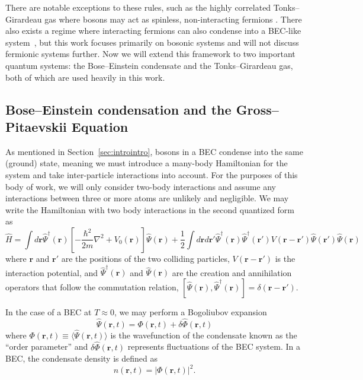 There are notable exceptions to these rules, such as the highly correlated Tonks--Girardeau gas where bosons may act as spinless, non-interacting fermions \cite{Girardeau}.
There also exists a regime where interacting fermions can also condense into a BEC-like system~\cite{Nozieres1985, Bulgac2014}, but this work focuses primarily on bosonic systems and will not discuss fermionic systems further.
Now we will extend this framework to two important quantum systems: the Bose--Einstein condensate and the Tonks--Girardeau gas, both of which are used heavily in this work.

\subsection{Bose--Einstein condensation and the Gross--Pitaevskii Equation}

As mentioned in Section~\ref{sec:introintro}, bosons in a BEC condense into the same (ground) state, meaning we must introduce a many-body Hamiltonian for the system and take inter-particle interactions into account.
For the purposes of this body of work, we will only consider two-body interactions and assume any interactions between three or more atoms are unlikely and negligible.
We may write the Hamiltonian with two body interactions in the second quantized form as
\begin{equation}
    \hat H = \int d\mathbf{r} \hat \Psi^\dagger(\mathbf{r})\left[-\frac{\hbar^2}{2m}\nabla^2 + V_0(\mathbf{r}) \right]\hat \Psi(\mathbf{r}) + \frac{1}{2} \int d\mathbf{r} d\mathbf{r'} \hat \Psi^\dagger(\mathbf{r}) \hat \Psi^\dagger(\mathbf{r'}) V(\mathbf{r} - \mathbf{r'})\hat \Psi(\mathbf{r'}) \hat \Psi(\mathbf{r})
    \label{eqn:2nd}
\end{equation}
where $\mathbf{r}$ and $\mathbf{r'}$ are the positions of the two colliding particles, $V(\mathbf{r}-\mathbf{r'})$ is the interaction potential, and $\hat \Psi^\dagger(\mathbf{r})$ and $\hat \Psi(\mathbf{r})$ are the creation and annihilation operators that follow the commutation relation, $[\hat \Psi(\mathbf{r}),\hat \Psi^\dagger(\mathbf{r})] = \delta(\mathbf{r} - \mathbf{r'})$.

In the case of a BEC at $T\approx0$, we may perform a Bogoliubov expansion~\cite{Bogoliubov1947, Dalfovo1999}
\begin{equation}
    \hat \Psi (\mathbf{r}, t) = \Phi(\mathbf{r},t) + \delta \hat \Phi(\mathbf{r},t)
\label{eqn:bog}
\end{equation}
where $\Phi(\mathbf{r},t) \equiv \langle \hat \Psi(\mathbf{r},t) \rangle$ is the wavefunction of the condensate known as the ``order parameter'' and $\delta \hat \Phi(\mathbf{r},t)$ represents fluctuations of the BEC system.
In a BEC, the condensate density is defined as
\begin{equation}
    n(\mathbf{r},t) = |\Phi(\mathbf{r},t)|^2.
\end{equation}

